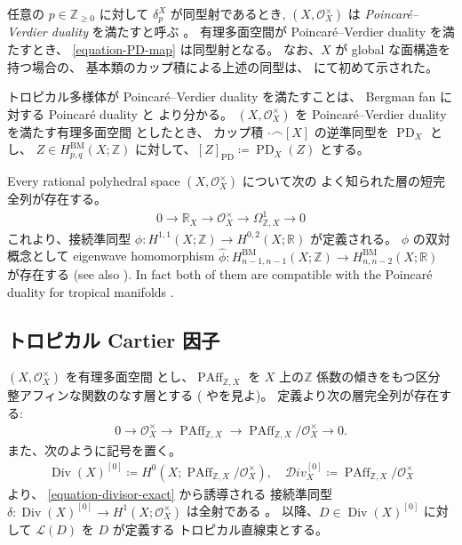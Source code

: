\documentclass[a4paper,dvipdfmx,reqno,12pt]{amsart}
\theoremstyle{definition}
\newcommand{\deq}{\coloneqq}
\newcommand{\opn}[1]{\operatorname{#1}}
\newcommand{\PD}[1]{[#1]_{\mathrm{PD}}}
\numberwithin{equation}{section}
\begin{document}
任意の $p\in \mathbb{Z}_{\geq 0}$ に対して
$\delta_{p}^{X}$ が同型射であるとき,
$(X,\mathcal{O}_X^{\times})$ は
\emph{Poincar\'e--Verdier duality}
を満たすと呼ぶ \cite[Definition 6.4]{MR4637248}。
有理多面空間が Poincar\'e--Verdier duality を満たすとき、
\cref{equation-PD-map} は同型射となる。
なお、$X$ が global な面構造を持つ場合の、
基本類のカップ積による上述の同型は、
\cite[Theorem 5.3]{MR3894860} にて初めて示された。


トロピカル多様体が
Poincar\'e--Verdier duality を満たすことは、
Bergman fan に対する Poincar\'e duality
\cite[Proposition 5.5]{MR3894860} と
\cite[Theorem 6.7]{MR4637248}
より分かる。
$(X,\mathcal{O}_X^{\times})$ を
Poincar\'e--Verdier duality を満たす有理多面空間
としたとき、
カップ積
$\cdot \frown [X]$
の逆準同型を $\opn{PD}_X$ とし、
$Z\in H^{\mathrm{BM}}_{p,q}(X;\mathbb{Z})$
に対して、$\PD{Z}\deq \opn{PD}_X(Z)$ とする。



Every rational polyhedral space $(X,\mathcal{O}_X^{\times})$
について次の
よく知られた層の短完全列が存在する。
\begin{align}
0\to \mathbb{R}_X \to 
\mathcal{O}_X^{\times} \to \Omega_{\mathbb{Z},X}^{1}\to 0
\end{align}
これより、接続準同型
$\phi \colon H^{1,1}(X;\mathbb{Z})
\to H^{0,2}(X;\mathbb{R})$ が定義される。
$\phi$ の双対概念として
eigenwave homomorphism
$\hat{\phi} \colon
H_{n-1,n-1}^{\mathrm{BM}}(X;\mathbb{Z})
\to H_{n,n-2}^{\mathrm{BM}}(X;\mathbb{R})$
が存在する \cite[(5.2)]{MR3330789}
(see also \cite[Definition 2.9]{MR3894860}).
In fact both of them are compatible with 
the Poincar\'e duality for tropical manifolds
\cite[Lemma 5.13]{MR3894860}.

\subsection{トロピカル Cartier 因子}

$(X,\mathcal{O}_X^{\times})$ を有理多面空間
とし、$\opn{PAff}_{\mathbb{Z},X}$ を
$X$ 上の$\mathbb{Z}$ 係数の傾きをもつ区分
整アフィンな関数のなす層とする
(\cite[Definition 4.1]{MR3894860}
や\cite[Definition 3.8 and Remark
3.9]{MR4246795}を見よ)。
定義より次の層完全列が存在する:
\begin{align}
\label{equation-divisor-exact}
0 \to  \mathcal{O}_X^{\times} 
\to \opn{PAff}_{\mathbb{Z},X} \to 
\opn{PAff}_{\mathbb{Z},X}/\mathcal{O}_X^{\times}
\to 0.
\end{align}
また、次のように記号を置く。
\begin{align}
\opn{Div}(X)^{[0]}\deq H^{0}(X;
\opn{PAff}_{\mathbb{Z},X}/\mathcal{O}_X^{\times}), 
\quad \mathcal{D}iv_X^{[0]}\deq \opn{PAff}_{\mathbb{Z},X}/\mathcal{O}_X^{\times}
\end{align}
\cite[Lemma 4.5]{MR3894860} より、
\eqref{equation-divisor-exact} から誘導される
接続準同型
$\delta \colon \opn{Div}(X)^{[0]}\to 
H^{1}(X;\mathcal{O}_X^{\times})$ は全射である
\cite[Proposition 4.6]{MR3894860}。
以降、$D\in \opn{Div}(X)^{[0]}$ に対して
$\mathcal{L}(D)$ を $D$ が定義する
トロピカル直線束とする。
\end{document}
